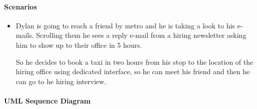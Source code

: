 \paragraph{Scenarios}
\begin{itemize}
	\item Dylan is going to reach a friend by metro and he is taking a look to his e-mails. Scrolling them he sees a reply e-mail from a hiring newsletter asking him to show up to their office in 5 hours. \par So he decides to book a taxi in two hours from his stop to the location of the hiring office using \myTaxiService{} dedicated interface, so he can meet his friend and then he can go to he hiring interview.
\end{itemize}
\paragraph{UML Sequence Diagram}
